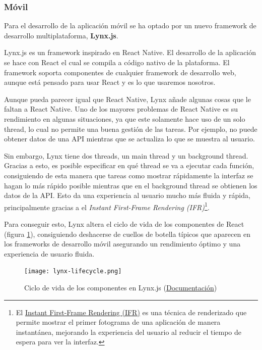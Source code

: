 \subsubsection{Móvil}
Para el desarrollo de la aplicación móvil se ha optado por un nuevo framework de desarrollo multiplataforma, \textbf{Lynx.js}.

Lynx.js es un framework inspirado en React Native. El desarrollo de la aplicación se hace con React el cual se compila a código nativo de la plataforma. El framework soporta componentes de cualquier framework de desarrollo web, aunque está pensado para usar React y es lo que usaremos nosotros.

Aunque pueda parecer igual que React Native, Lynx añade algunas cosas que le faltan a React Native. Uno de los mayores problemas de React Native es su rendimiento en algunas situaciones, ya que este solamente hace uso de un solo thread, lo cual no permite una buena gestión de las tareas. Por ejemplo, no puede obtener datos de una API mientras que se actualiza lo que se muestra al usuario.

Sin embargo, Lynx tiene dos threads, un main thread y un background thread.
Gracias a esto, es posible especificar en qué thread se va a ejecutar cada función, consiguiendo de esta manera que tareas como mostrar rápidamente la interfaz se hagan lo más rápido posible mientras que en el background thread se obtienen los datos de la API.
Esto da una experiencia al usuario mucho más fluida y rápida, principalmente gracias a el \textit{Instant First-Frame Rendering (IFR)}\footnote{El \href{https://lynxjs.org/guide/interaction/ifr.html}{Instant First-Frame Rendering (IFR)} es una técnica de renderizado que permite mostrar el primer fotograma de una aplicación de manera instantánea, mejorando la experiencia del usuario al reducir el tiempo de espera para ver la interfaz.}.

Para conseguir esto, Lynx altera el ciclo de vida de los componentes de React (figura \ref{fig:lynx-component-lifecycle}), consiguiendo deshacerse de cuellos de botella típicos que aparecen en los frameworks de desarrollo móvil asegurando un rendimiento óptimo y una experiencia de usuario fluida.

\begin{figure}[h]
    \begin{center}
        \texttt{[image: lynx-lifecycle.png]}
    \end{center}
    \caption{Ciclo de vida de los componentes en Lynx.js (\href{https://lynxjs.org/react/lifecycle.html}{Documentación})}
    \label{fig:lynx-component-lifecycle}
\end{figure}


